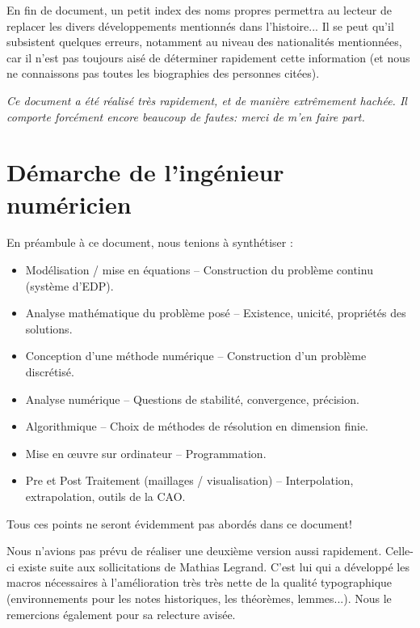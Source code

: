 \documentclass[11pt,pdflatex]{book}
\begin{document}
\medskip
En fin de document, un petit index des noms propres permettra au lecteur
de replacer les divers développements mentionnés dans l'histoire...
Il se peut qu'il subsistent quelques erreurs, notamment au niveau des
nationalités mentionnées, car il n'est pas toujours aisé de déterminer rapidement cette 
information (et nous ne connaissons pas toutes les biographies des personnes citées).

\medskip
\emph{Ce document a été réalisé très rapidement, et de manière extrêmement hachée.
Il comporte forcément encore beaucoup de fautes: merci de m'en faire part.}




\bigskip
\section*{Démarche de l'ingénieur numéricien}

En préambule à ce document, nous tenions à synthétiser :
\begin{itemize}
  \item Modélisation / mise en équations -- Construction du problème continu (système d'EDP).
  \item Analyse mathématique du problème posé -- Existence, unicité, propriétés des solutions.
  \item Conception d'une méthode numérique -- Construction d'un problème discrétisé.
  \item Analyse numérique -- Questions de stabilité, convergence, précision.
  \item Algorithmique -- Choix de méthodes de résolution en dimension finie.
  \item Mise en œuvre sur ordinateur -- Programmation.
  \item Pre et Post Traitement (maillages / visualisation) -- Interpolation, extrapolation, outils de la CAO.
\end{itemize}

\medskip
Tous ces points ne seront évidemment pas abordés dans ce document!
\vfill
\noindent
{}

Nous n'avions pas prévu de réaliser une deuxième version aussi rapidement.
Celle-ci existe suite aux sollicitations de Mathias Legrand.
C'est lui qui a développé les macros nécessaires à l'amélioration très très nette de la 
qualité typographique (environnements pour les notes historiques, les théorèmes, lemmes...).
Nous le remercions également pour sa relecture avisée.
\end{document}
